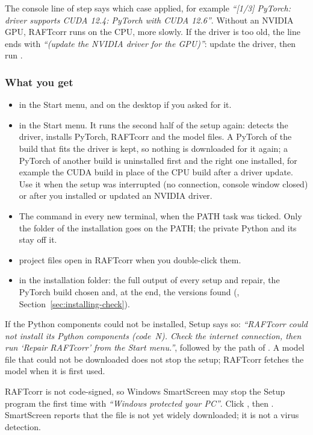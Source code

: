 The console line of step \file{[1/3]} says which case applied, for example
\emph{``[1/3] PyTorch: driver supports CUDA 12.4: PyTorch with CUDA 12.6''}. Without an NVIDIA GPU, RAFTcorr runs
on the CPU, more slowly. If the driver is too old, the line ends with \emph{``(update the NVIDIA
driver for the GPU)''}: update the driver, then run .

\subsubsection*{What you get}
\begin{itemize}
  \item {} in the Start menu, and on the desktop if you asked for it.
  \item {} in the Start menu. It runs the second half of the setup again:
    detects the driver, installs PyTorch, RAFTcorr and the model files. A PyTorch of the build
    that fits the driver is kept, so nothing is downloaded for it again; a PyTorch of another
    build is uninstalled first and the right one installed, for example the CUDA build in place
    of the CPU build after a driver update. Use it when the setup was interrupted (no connection,
    console window closed) or after you installed or updated an NVIDIA driver.
  \item The  command in every new terminal, when the PATH task was ticked. Only the
    folder  of the installation goes on the PATH; the private Python and its
     stay off it.
  \item {} project files open in RAFTcorr when you double-click them.
  \item {} in the installation folder: the full output of every setup and
    repair, the PyTorch build chosen and, at the end, the versions found
    (, Section~\ref{sec:installing-check}).
\end{itemize}

If the Python components could not be installed, Setup says so: \emph{``RAFTcorr could not install
its Python components (code~N). Check the internet connection, then run `Repair RAFTcorr' from the
Start menu.''}, followed by the path of . A model file that could not be
downloaded does not stop the setup; RAFTcorr fetches the model when it is first used.

\begin{notebox}
RAFTcorr is not code-signed, so Windows SmartScreen may stop the Setup program the first time
with \emph{``Windows protected your PC''}. Click , then . SmartScreen
reports that the file is not yet widely downloaded; it is not a virus detection.
\end{notebox}

